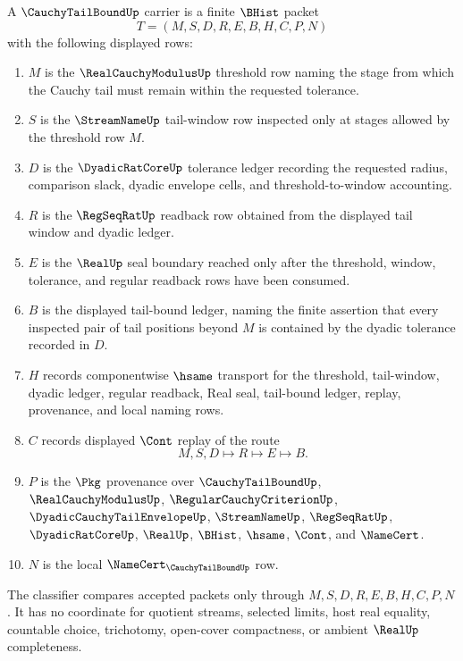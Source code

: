 \begin{definition}
\label{def:cauchy-tail-bound-carrier}
A $\CauchyTailBoundUp$ carrier is a finite $\BHist$ packet
$$
T=(M,S,D,R,E,B,H,C,P,N)
$$
with the following displayed rows:
\begin{enumerate}
\item $M$ is the $\RealCauchyModulusUp$ threshold row naming the stage from which the Cauchy tail must remain within the requested tolerance.
\item $S$ is the $\StreamNameUp$ tail-window row inspected only at stages allowed by the threshold row $M$.
\item $D$ is the $\DyadicRatCoreUp$ tolerance ledger recording the requested radius, comparison slack, dyadic envelope cells, and threshold-to-window accounting.
\item $R$ is the $\RegSeqRatUp$ readback row obtained from the displayed tail window and dyadic ledger.
\item $E$ is the $\RealUp$ seal boundary reached only after the threshold, window, tolerance, and regular readback rows have been consumed.
\item $B$ is the displayed tail-bound ledger, naming the finite assertion that every inspected pair of tail positions beyond $M$ is contained by the dyadic tolerance recorded in $D$.
\item $H$ records componentwise $\hsame$ transport for the threshold, tail-window, dyadic ledger, regular readback, Real seal, tail-bound ledger, replay, provenance, and local naming rows.
\item $C$ records displayed $\Cont$ replay of the route
$$
M,S,D\longmapsto R\longmapsto E\longmapsto B .
$$
\item $P$ is the $\Pkg$ provenance over $\CauchyTailBoundUp$, $\RealCauchyModulusUp$, $\RegularCauchyCriterionUp$, $\DyadicCauchyTailEnvelopeUp$, $\StreamNameUp$, $\RegSeqRatUp$, $\DyadicRatCoreUp$, $\RealUp$, $\BHist$, $\hsame$, $\Cont$, and $\NameCert$.
\item $N$ is the local $\NameCert_{\CauchyTailBoundUp}$ row.
\end{enumerate}
The classifier compares accepted packets only through $M,S,D,R,E,B,H,C,P,N$. It has no coordinate for quotient streams, selected limits, host real equality, countable choice, trichotomy, open-cover compactness, or ambient $\RealUp$ completeness.
\end{definition}


